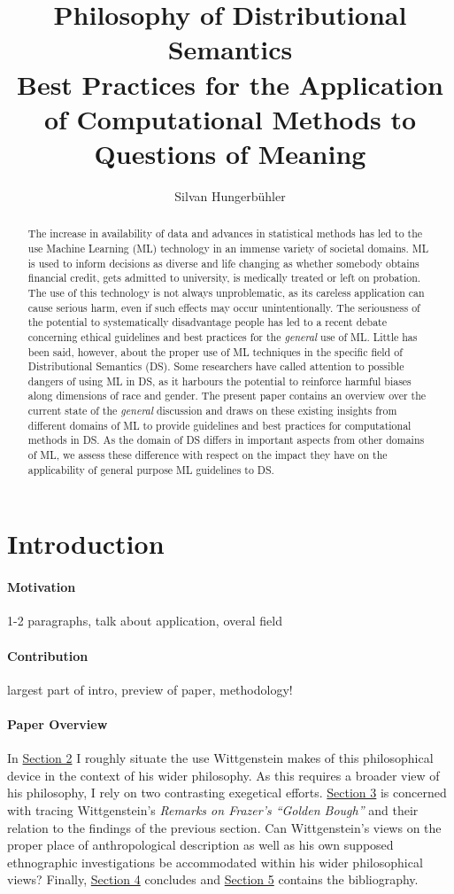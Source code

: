 \documentclass{article}
\title{Philosophy of Distributional Semantics\\
\large Best Practices for the Application of Computational Methods to Questions of Meaning}
\date{}
\author{Silvan Hungerb{\"u}hler}
\begin{document}
\maketitle
\begin{abstract}
The increase in availability of data and advances in statistical methods has led to the use Machine Learning (ML) technology in an immense variety of societal domains. ML is used to inform decisions as diverse and life changing as whether somebody obtains financial credit, gets admitted to university, is medically treated or left on probation.
The use of this technology is not always unproblematic, as its careless application can cause serious harm, even if such effects may occur unintentionally.
The seriousness of the potential to systematically disadvantage people has led to a recent debate concerning ethical guidelines and best practices for the \emph{general} use of ML.
Little has been said, however, about the proper use of ML techniques in the specific field of Distributional Semantics (DS). Some researchers have called attention to possible dangers of using ML in DS, as it harbours the potential to reinforce harmful biases along dimensions of race and gender.
The present paper contains an overview over the current state of the \emph{general} discussion 
and draws on these existing insights from different domains of ML to provide guidelines and best practices for computational methods in DS.
As the domain of DS differs in important aspects from other domains of ML, 
we assess these difference with respect on the impact they have on the applicability of general purpose ML guidelines to DS.
\end{abstract}
\section{Introduction}
\paragraph{Motivation}
1-2 paragraphs, talk about application, overal field
\paragraph{Contribution}
largest part of intro, preview of paper, methodology!
\paragraph{Paper Overview}
In \hyperlink{sec2}{Section 2} I roughly situate the use Wittgenstein makes of this philosophical device in the context of his wider philosophy. As this requires a broader view of his philosophy, I rely on two contrasting exegetical efforts.
\hyperlink{sec3}{Section 3} is concerned with tracing Wittgenstein's \textit{Remarks on Frazer's ``Golden Bough''} and their relation to the findings of the previous section. Can Wittgenstein’s views on the proper place of anthropological description as well as his own supposed ethnographic investigations be accommodated within his wider philosophical views? Finally, \hyperlink{sec4}{Section 4} concludes and \hyperlink{sec5}{Section 5} contains the bibliography.
\end{document}
